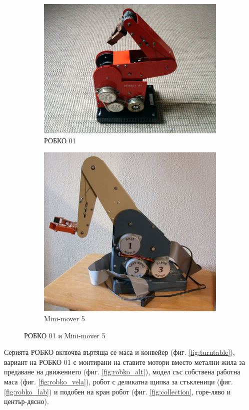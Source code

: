 \begin{figure}
    \centering
    \begin{subfigure}{1\textwidth}
        \centering
        \includegraphics[width=.7\linewidth]{pictures/robko01.jpg}
        \caption{РОБКО 01}
        \label{fig:robko01}
    \end{subfigure}
    \par\bigskip
    \begin{subfigure}{1\textwidth}
        \centering
        \includegraphics[width=.7\linewidth]{pictures/mini_mover.jpg}
        \caption{Mini-mover 5}
        \label{fig:mini_mover}
    \end{subfigure}
    \caption{РОБКО 01 и Mini-mover 5}
    \label{fig:robko01_mini_mover}
\end{figure}
Серията РОБКО включва въртяща се маса и конвейер (фиг. \ref{fig:turntable}), вариант на РОБКО 01 с монтирани на ставите мотори вместо метални жила за предаване на движението (фиг. \ref{fig:robko_alt}), модел със собствена работна маса (фиг. \ref{fig:robko_vela}), робот с деликатна щипка за стъкленици (фиг. \ref{fig:robko_lab}) и подобен на кран робот (фиг. \ref{fig:collection}, горе-ляво и център-дясно).
